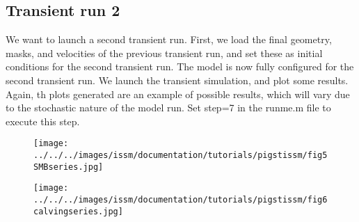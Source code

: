 \subsection{Transient run 2}%
We want to launch a second transient run. First, we load the final geometry, masks, and velocities of the previous transient run, and set these as initial conditions for the second transient run. The model is now fully configured for the second transient run. We launch the transient simulation, and plot some results. Again, th plots generated are an example of possible results, which will vary due to the stochastic nature of the model run.
Set step=7 in the runme.m file to execute this step.
\begin{figure}
	\begin{center}
		\texttt{[image: ../../../images/issm/documentation/tutorials/pigstissm/fig5SMBseries.jpg]}
	\end{center}
\end{figure}
\begin{figure}
	\begin{center}
		\texttt{[image: ../../../images/issm/documentation/tutorials/pigstissm/fig6calvingseries.jpg]}
	\end{center}
\end{figure}
